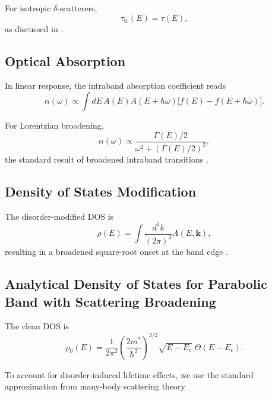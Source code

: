 For isotropic $\delta$-scatterers,
\begin{equation}
\tau_{\mathrm{tr}}(E) = \tau(E),
\end{equation}
as discussed in \cite{Mahan2000,Schirmacher2009}.

\subsection{Optical Absorption}

In linear response, the intraband absorption coefficient reads \cite{YuCardona2010}
\begin{equation}
\alpha(\omega) \propto
\int dE\,
A(E) A(E+\hbar\omega)
\big[ f(E) - f(E+\hbar\omega) \big].
\end{equation}

For Lorentzian broadening,
\begin{equation}
\alpha(\omega) \propto 
\frac{\Gamma(E)/2}{\omega^2 + (\Gamma(E)/2)^2},
\end{equation}
the standard result of broadened intraband transitions \cite{Mahan2000}.

\subsection{Density of States Modification}

The disorder-modified DOS is
\begin{equation}
\rho(E) =
\int \frac{d^3 k}{(2\pi)^3} A(E,\mathbf{k}),
\end{equation}
resulting in a broadened square-root onset at the band edge \cite{YuCardona2010}.


\subsection{Analytical Density of States for Parabolic Band with Scattering Broadening}
\label{subsec:DOS_broadened}

The clean DOS is \cite{YuCardona2010}
\begin{equation}
\label{eq:rho0_clean}
\rho_0(E)
=
\frac{1}{2\pi^2}
\left( \frac{2 m^\ast}{\hbar^2} \right)^{3/2}
\sqrt{E - E_c}
\;\Theta(E - E_c).
\end{equation}

To account for disorder-induced lifetime effects, we use the standard approximation from many-body scattering theory 
\cite{Mahan2000,Economou2006}

